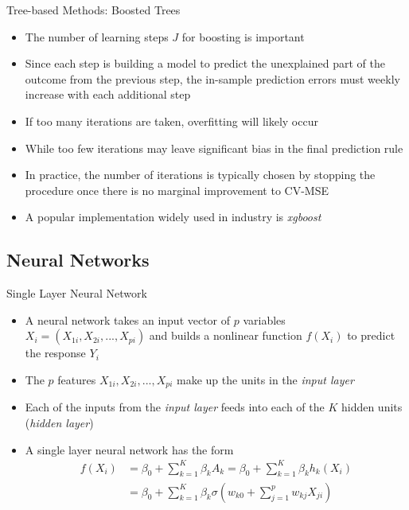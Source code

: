 \documentclass[aspectratio=1610,12pt,xcolor=dvipsnames]{beamer}
\begin{document}
\begin{frame}{Tree-based Methods: Boosted Trees}

\begin{itemize}
    \item The number of learning steps $J$ for boosting is important
    \item Since each step is building a model to predict the unexplained part of the outcome from the previous step, the in-sample prediction errors must weekly increase with each additional step
    \item If too many iterations are taken, overfitting will likely occur
    \item While too few iterations may leave significant bias in the final prediction rule
    \item In practice, the number of iterations is typically chosen by stopping the procedure once there is no marginal improvement to CV-MSE
    \item A popular implementation widely used in industry is \textit{xgboost}
\end{itemize}

\end{frame}

\subsection{Neural Networks}

\begin{frame}
  \subsectionpage
\end{frame}

\begin{frame}{Single Layer Neural Network}

\begin{itemize}
    \item A neural network takes an input vector of $p$ variables $X_i = (X_{1i}, X_{2i}, ... ,X_{pi})$ and builds a nonlinear function $f(X_i)$ to predict the response $Y_i$
    \item The $p$ features $X_{1i}, X_{2i}, ... ,X_{pi}$ make up the units in the \textit{input layer}
    \item Each of the inputs from the \textit{input layer} feeds into each of the $K$ hidden units (\textit{hidden layer})
    \item A single layer neural network has the form
    \begin{align*}
        f(X_i) &= \beta_0 + \sum_{k=1}^K \beta_k A_k = \beta_0 + \sum_{k=1}^K \beta_k h_k(X_i) \\
        &= \beta_0 + \sum_{k=1}^K \beta_k \sigma \left(w_{k0} + \sum_{j=1}^p w_{kj} X_{ji} \right)
    \end{align*}
\end{itemize}
\end{frame}
\end{document}
